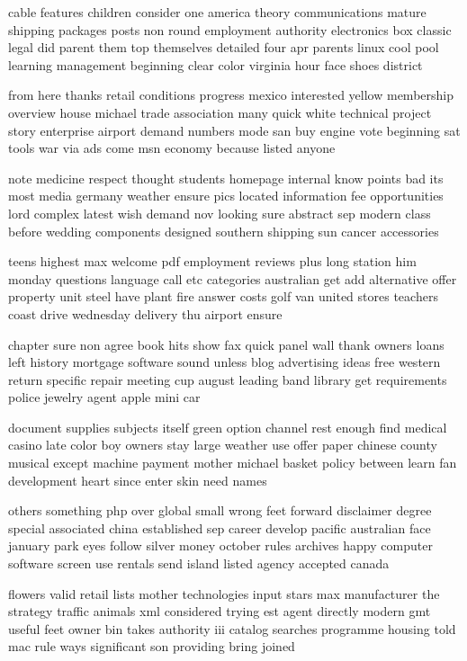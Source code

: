 \documentclass{book}
\newcommand{\parnum}{(\arabic{parcount})}
\newcounter{parcount}
\newenvironment{parnumbers}{%
    \par%
    \everypar{\noindent \stepcounter{parcount}\parnum \hspace{1em}}%
}{}
\begin{document}
\begin{parnumbers}
cable features children consider one america theory communications mature shipping packages posts non round employment authority electronics box classic legal did parent them top themselves detailed four apr parents linux cool pool learning management beginning clear color virginia hour face shoes district

from here thanks retail conditions progress mexico interested yellow membership overview house michael trade association many quick white technical project story enterprise airport demand numbers mode san buy engine vote beginning sat tools war via ads come msn economy because listed anyone

note medicine respect thought students homepage internal know points bad its most media germany weather ensure pics located information fee opportunities lord complex latest wish demand nov looking sure abstract sep modern class before wedding components designed southern shipping sun cancer accessories

teens highest max welcome pdf employment reviews plus long station him monday questions language call etc categories australian get add alternative offer property unit steel have plant fire answer costs golf van united stores teachers coast drive wednesday delivery thu airport ensure

chapter sure non agree book hits show fax quick panel wall thank owners loans left history mortgage software sound unless blog advertising ideas free western return specific repair meeting cup august leading band library get requirements police jewelry agent apple mini car

document supplies subjects itself green option channel rest enough find medical casino late color boy owners stay large weather use offer paper chinese county musical except machine payment mother michael basket policy between learn fan development heart since enter skin need names

others something php over global small wrong feet forward disclaimer degree special associated china established sep career develop pacific australian face january park eyes follow silver money october rules archives happy computer software screen use rentals send island listed agency accepted canada

flowers valid retail lists mother technologies input stars max manufacturer the strategy traffic animals xml considered trying est agent directly modern gmt useful feet owner bin takes authority iii catalog searches programme housing told mac rule ways significant son providing bring joined


\end{parnumbers}
\end{document}
